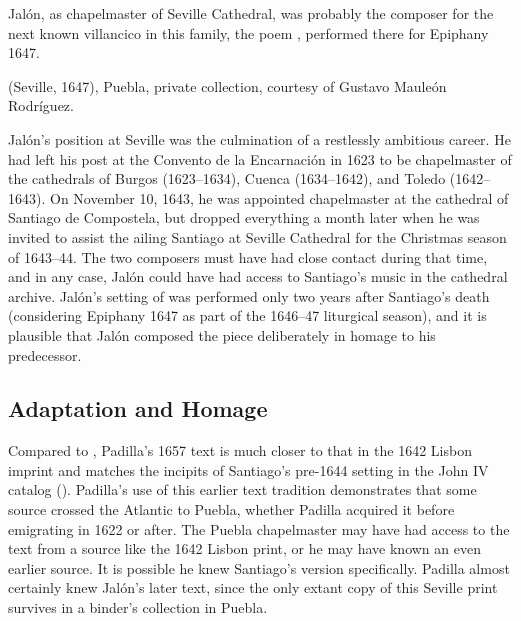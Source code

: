 Jalón, as chapelmaster of Seville Cathedral, was probably the composer for the
next known villancico in this family, the poem ,
performed there for Epiphany 1647.%
\begin{Footnote}
     (Seville, 1647), Puebla, private collection,
    courtesy of Gustavo Mauleón Rodríguez.
\end{Footnote}
Jalón's position at Seville was the culmination of a restlessly ambitious
career.
He had left his post at the Convento de la Encarnación in 1623 to be
chapelmaster of the cathedrals of Burgos (1623--1634), Cuenca (1634--1642), and
Toledo (1642--1643).
On November 10, 1643, he was appointed chapelmaster at the cathedral of Santiago
de Compostela, but dropped everything a month later when he was invited to
assist the ailing Santiago at Seville Cathedral for the Christmas season of
1643--44.
The two composers must have had close contact during that time, and in any case,
Jalón could have had access to Santiago's music in the cathedral archive.
Jalón's setting of  was performed only two years after
Santiago's death (considering Epiphany 1647 as part of the 1646--47 liturgical
season), and it is plausible that Jalón composed the piece deliberately in
homage to his predecessor.


\subsection{Adaptation and Homage}

Compared to , Padilla's 1657 text  is much closer to that in the 1642 Lisbon imprint and matches the
incipits of Santiago's pre-1644 setting in the John IV catalog
().
Padilla's use of this earlier text tradition demonstrates that some source
crossed the Atlantic to Puebla, whether Padilla acquired it before emigrating in
1622 or after.
The Puebla chapelmaster may have had access to the text from a source like the
1642 Lisbon print, or he may have known an even earlier source.
It is possible he knew Santiago's version specifically.
Padilla almost certainly knew Jalón's later  text, since the
only extant copy of this Seville print survives in a binder's collection in
Puebla.

